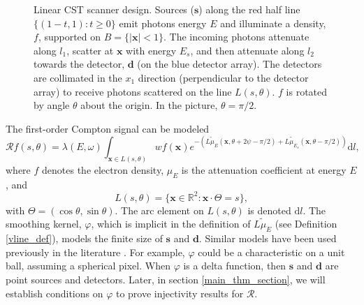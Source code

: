 \documentclass[a4paper,12pt]{amsart}
\numberwithin{equation}{section}
\theoremstyle{plain}
\numberwithin{theorem}{section}
\theoremstyle{definition}
\theoremstyle{remark}
\theoremstyle{remark}
\theoremstyle{remark}
\newcommand{\paren}[1]{\left(#1\right)}               %
\newcommand{\vx}{{\mathbf{x}}}
\newcommand{\vs}{\mathbf{s}}
\newcommand{\vd}{\mathbf{d}}
\newcommand\irregularcircle[2]{%
  \pgfextra {\pgfmathsetmacro\len{(#1)+rand*(#2)}}
  +(0:\len pt)
  \foreach \a in {10,20,...,350}{
    \pgfextra {\pgfmathsetmacro\len{(#1)+rand*(#2)}}
    -- +(\a:\len pt)
  } -- cycle
}
\begin{document}
\begin{figure}[!h]
\centering
{}
\caption{Linear CST scanner design. Sources ($\vs$) along the red half line $\{(1 - t,1) : t\geq 0\}$ emit photons energy $E$ and illuminate a density, $f$, supported on $B = \{|\vx|<1\}$. The incoming photons attenuate along $l_1$, scatter at $\vx$ with energy $E_s$, and then attenuate along $l_2$ towards the detector, $\vd$ (on the blue detector array). The detectors are collimated in the $x_1$ direction (perpendicular to the detector array) to receive photons scattered on the line $L(s,\theta)$. $f$ is rotated by angle $\theta$ about the origin. In the picture, $\theta = \pi/2$.}
\label{fig1}
\end{figure}

The first-order Compton signal can be modeled
\begin{equation}
\label{model_0}
\mathcal{R}f(s,\theta) = \lambda(E,\omega)\int_{\vx\in L(s,\theta)}w f(\vx)e^{-\paren{ \widetilde{L \mu_E}(\vx, \theta + 2\psi - \pi/2) + \widetilde{L\mu_{E_s}}(\vx, \theta - \pi/2)}}\mathrm{d}l,
\end{equation}
where $f$ denotes the electron density, $\mu_E$ is the attenuation coefficient at energy $E$, and
\begin{equation}
L(s,\theta) = \{\vx\in\mathbb{R}^2 : \vx \cdot \Theta = s\},
\end{equation}
with $\Theta = (\cos\theta,\sin\theta)$. The arc element on $L(s,\theta)$ is denoted $\mathrm{d}l$. The smoothing kernel, $\varphi$, which is implicit in the definition of $\widetilde{L\mu_E}$ (see Definition \ref{vline_def}), models the finite size of $\vs$ and $\vd$. {Similar models have been used previously in the literature \cite{ziou2021scale}.} For example, $\varphi$ could be a characteristic on a unit ball, assuming a spherical pixel. When $\varphi$ is a delta function, then $\vs$ and $\vd$ are point sources and detectors. Later, in section \ref{main_thm_section}, we will establish conditions on $\varphi$ to prove injectivity results for $\mathcal{R}$. 
\end{document}
